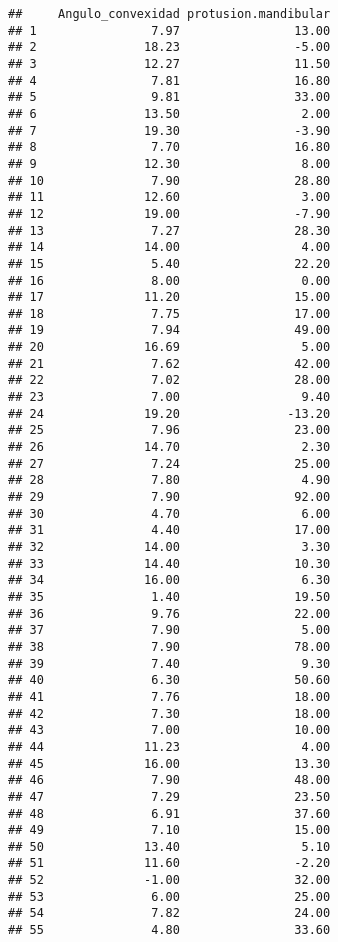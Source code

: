 \documentclass[
]{book}
\begin{document}
\begin{verbatim}
##     Angulo_convexidad protusion.mandibular
## 1                7.97                13.00
## 2               18.23                -5.00
## 3               12.27                11.50
## 4                7.81                16.80
## 5                9.81                33.00
## 6               13.50                 2.00
## 7               19.30                -3.90
## 8                7.70                16.80
## 9               12.30                 8.00
## 10               7.90                28.80
## 11              12.60                 3.00
## 12              19.00                -7.90
## 13               7.27                28.30
## 14              14.00                 4.00
## 15               5.40                22.20
## 16               8.00                 0.00
## 17              11.20                15.00
## 18               7.75                17.00
## 19               7.94                49.00
## 20              16.69                 5.00
## 21               7.62                42.00
## 22               7.02                28.00
## 23               7.00                 9.40
## 24              19.20               -13.20
## 25               7.96                23.00
## 26              14.70                 2.30
## 27               7.24                25.00
## 28               7.80                 4.90
## 29               7.90                92.00
## 30               4.70                 6.00
## 31               4.40                17.00
## 32              14.00                 3.30
## 33              14.40                10.30
## 34              16.00                 6.30
## 35               1.40                19.50
## 36               9.76                22.00
## 37               7.90                 5.00
## 38               7.90                78.00
## 39               7.40                 9.30
## 40               6.30                50.60
## 41               7.76                18.00
## 42               7.30                18.00
## 43               7.00                10.00
## 44              11.23                 4.00
## 45              16.00                13.30
## 46               7.90                48.00
## 47               7.29                23.50
## 48               6.91                37.60
## 49               7.10                15.00
## 50              13.40                 5.10
## 51              11.60                -2.20
## 52              -1.00                32.00
## 53               6.00                25.00
## 54               7.82                24.00
## 55               4.80                33.60

\end{verbatim}
\end{document}
